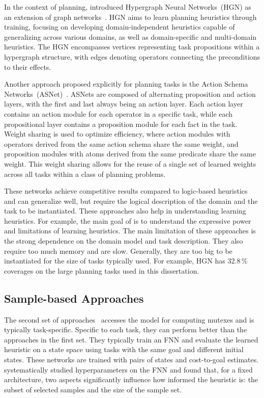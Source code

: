 In the context of planning, \citet{shen2020learning} introduced Hypergraph Neural Networks~(HGN) as an extension of graph networks~\cite{battaglia2018relational}. HGN aims to learn planning heuristics through training, focusing on developing domain-independent heuristics capable of generalizing across various domains, as well as domain-specific and multi-domain heuristics. The HGN encompasses vertices representing task propositions within a hypergraph structure, with edges denoting operators connecting the preconditions to their effects.

Another approach proposed explicitly for planning tasks is the Action Schema Networks~(ASNet)~\cite{toyer2018action}. ASNets are composed of alternating proposition and action layers, with the first and last always being an action layer. Each action layer contains an action module for each operator in a specific task, while each propositional layer contains a proposition module for each fact in the task. Weight sharing is used to optimize efficiency, where action modules with operators derived from the same action schema share the same weight, and proposition modules with atoms derived from the same predicate share the same weight. This weight sharing allows for the reuse of a single set of learned weights across all tasks within a class of planning problems.

These networks achieve competitive results compared to logic-based heuristics and can generalize well, but require the logical description of the domain and the task to be instantiated. These approaches also help in understanding learning heuristics. For example, the main goal of \citet{stahlberg2022learning} is to understand the expressive power and limitations of learning heuristics. The main limitation of these approaches is the strong dependence on the domain model and task description. They also require too much memory and are slow. Generally, they are too big to be instantiated for the size of tasks typically used. For example, HGN has $32.8\,\%$ coverages on the large planning tasks used in this dissertation.

\subsection{Sample-based Approaches}
\label{sec:related-work-sample-based}

The second set of approaches~\cite{ferber2020neural, yu2020learning, ferber2022neural, otoole2022sampling} accesses the model for computing mutexes and is typically task-specific. Specific to each task, they can perform better than the approaches in the first set. They typically train an FNN and evaluate the learned heuristic on a state space using tasks with the same goal and different initial states. These networks are trained with pairs of states and cost-to-goal estimates. \citet{ferber2020neural} systematically studied hyperparameters on the FNN and found that, for a fixed architecture, two aspects significantly influence how informed the heuristic is: the subset of selected samples and the size of the sample set.

